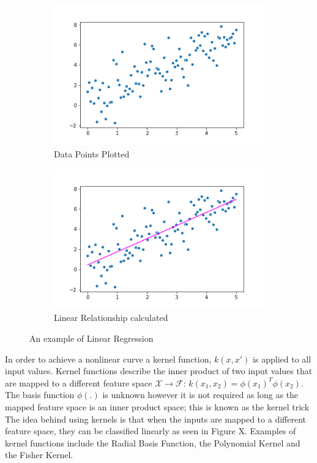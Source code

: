\documentclass[a4paper,11pt,twoside]{article}
\begin{document}
\begin{figure} [h!]
  \centering
  \begin{subfigure}[b]{0.4\textwidth}
    \includegraphics[width=\textwidth]{scatterplt_ex.png}
    \caption{Data Points Plotted}
    \label{fig:1}
  \end{subfigure}
  \begin{subfigure}[b]{0.4\textwidth}
    \includegraphics[width=\textwidth]{linregscatterplt.png}
    \caption{Linear Relationship calculated}
    \label{fig:2}
  \end{subfigure}
  \caption{An example of Linear Regression}
  \label{fig:3}
\end{figure}

In order to achieve a nonlinear curve a kernel function, $k(x,x')$ is applied to all input values. Kernel functions describe the inner product of two input values that are mapped to a different feature space $\mathcal{X} \rightarrow \mathcal{F}$: $k(x_{1},x_{2}) = \phi(x_{1})^T\phi(x_{2})$. The basis function $\phi(.)$ is unknown however it is not required as long as the mapped feature space is an inner product space; this is known as the kernel trick The idea behind using kernels is that when the inputs are mapped to a different feature space, they can be classified linearly as seen in Figure X. Examples of kernel functions include the Radial Basis Function, the Polynomial Kernel and the  Fisher Kernel.
\end{document}
